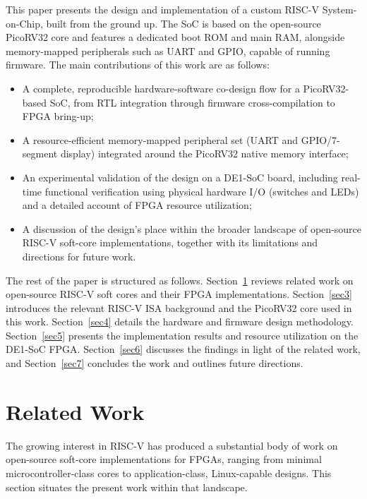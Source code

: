 \documentclass[runningheads]{llncs}
\begin{document}
This paper presents the design and implementation of a custom RISC-V System-on-Chip, built from the ground up. The SoC is based on the open-source PicoRV32 core and features a dedicated boot ROM and main RAM, alongside memory-mapped peripherals such as UART and GPIO, capable of running firmware. The main contributions of this work are as follows:
\begin{itemize}
\item A complete, reproducible hardware-software co-design flow for a PicoRV32-based SoC, from RTL integration through firmware cross-compilation to FPGA bring-up;
\item A resource-efficient memory-mapped peripheral set (UART and GPIO/7-segment display) integrated around the PicoRV32 native memory interface;
\item An experimental validation of the design on a DE1-SoC board, including real-time functional verification using physical hardware I/O (switches and LEDs) and a detailed account of FPGA resource utilization;
\item A discussion of the design's place within the broader landscape of open-source RISC-V soft-core implementations, together with its limitations and directions for future work.
\end{itemize}

\noindent The rest of the paper is structured as follows. Section~\ref{sec2} reviews related work on open-source RISC-V soft cores and their FPGA implementations. Section~\ref{sec3} introduces the relevant RISC-V ISA background and the PicoRV32 core used in this work. Section~\ref{sec4} details the hardware and firmware design methodology. Section~\ref{sec5} presents the implementation results and resource utilization on the DE1-SoC FPGA. Section~\ref{sec6} discusses the findings in light of the related work, and Section~\ref{sec7} concludes the work and outlines future directions.

\section{Related Work}\label{sec2}

The growing interest in RISC-V has produced a substantial body of work on open-source soft-core implementations for FPGAs, ranging from minimal microcontroller-class cores to application-class, Linux-capable designs. This section situates the present work within that landscape.
\end{document}
